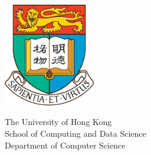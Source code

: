 \begin{titlepage}
\addtocounter{page}{-1}
\begin{center}

\begin{center}
    \includegraphics[width=0.3\textwidth]{Covers/hkulogo.png} %
\end{center}

\vspace{40pt} %

\begin{center}
    {The University of Hong Kong}\\[10pt] %
    {School of Computing and Data Science}\\[10pt] %
    {Department of Computer Science}\\[25pt] %
\end{center}

 

\end{center}
\end{titlepage}
